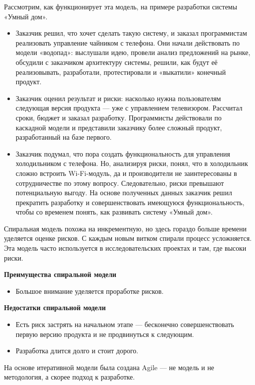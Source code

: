 \documentclass[a4paper]{article}
\begin{document}
Рассмотрим, как функционирует эта модель, на примере разработки системы «Умный дом».
\begin{itemize}
    \item Заказчик решил, что хочет сделать такую систему, и заказал программистам реализовать управление чайником с телефона. Они начали действовать по модели «водопад»: выслушали идею, провели анализ предложений на рынке, обсудили с заказчиком архитектуру системы, решили, как будут её реализовывать, разработали, протестировали и «выкатили» конечный продукт.
    \item Заказчик оценил результат и риски: насколько нужна пользователям следующая версия продукта — уже с управлением телевизором. Рассчитал сроки, бюджет и заказал разработку. Программисты действовали по каскадной модели и представили заказчику более сложный продукт, разработанный на базе первого.
    \item Заказчик подумал, что пора создать функциональность для управления холодильником с телефона. Но, анализируя риски, понял, что в холодильник сложно встроить Wi-Fi-модуль, да и производители не заинтересованы в сотрудничестве по этому вопросу. Следовательно, риски превышают потенциальную выгоду. На основе полученных данных заказчик решил прекратить разработку и совершенствовать имеющуюся функциональность, чтобы со временем понять, как развивать систему «Умный дом».
\end{itemize}


Спиральная модель похожа на инкрементную, но здесь гораздо больше времени уделяется оценке рисков. С каждым новым витком спирали процесс усложняется. Эта модель часто используется в исследовательских проектах и там, где высоки риски.

\noindent\textbf{Преимущества спиральной модели}
\begin{itemize}
  \item Большое внимание уделяется проработке рисков.
\end{itemize}
\noindent\textbf{Недостатки спиральной модели}
\begin{itemize}
  \item Есть риск застрять на начальном этапе — бесконечно совершенствовать первую версию продукта и не продвинуться к следующим.
  \item Разработка длится долго и стоит дорого.
\end{itemize}

На основе итеративной модели была создана Agile — не модель и не методология, а скорее подход к разработке.
\end{document}
